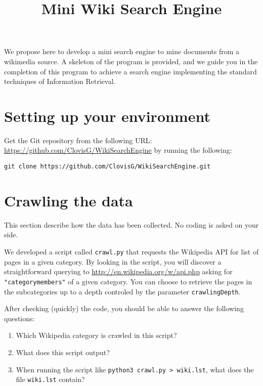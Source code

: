 \documentclass[mathserif, 11pt,c]{article}
\title{Mini Wiki Search Engine}
\begin{document}
\setcounter{secnumdepth}{1} 

\newcommand{\normtwo}[1]{\left|\left|#1\right|\right|_2} 
\newcommand{\normmat}[1]{\left|\left|\left|#1\right|\right|\right|} 
\newcommand{\n}[1]{\lVert #1 \rVert} 
\newcommand{\myd}[2]{ 2\log{\dfrac{\n{#1}.\n{#2}}{#1\cdot #2}}}

\maketitle


We propose here to develop a mini search engine to mine documents from a wikimedia source. A skeleton of the program is provided, and we guide you in the completion of this program to achieve a search engine implementing the standard techniques of Information Retrieval.


\section{Setting up your environment}

Get the Git repository from the following URL: \url{https://github.com/ClovisG/WikiSearchEngine} by running the following:

\texttt{git clone https://github.com/ClovisG/WikiSearchEngine.git}




\section{Crawling the data}



This section describe how the data has been collected. No coding is asked on your side.

We developed a script called \texttt{crawl.py} that requests the Wikipedia API for list of pages in a given category. By looking in the script, you will discover a straightforward querying to \url{http://en.wikipedia.org/w/api.php} asking for \texttt{"categorymembers"} of a given category. You can choose to retrieve the pages in the subcategories up to a depth controled by the parameter \texttt{crawlingDepth}.


After checking (quickly) the code, you should be able to answer the following questions:
\begin{enumerate}[label=\textbf{Q\thesection.\arabic*}]
	\item Which Wikipedia category is crawled in this script?
	\item What does this script output?
	\item When running the script like \texttt{python3 crawl.py > wiki.lst}, what does the file \texttt{wiki.lst} contain?
\end{enumerate}
\end{document}
